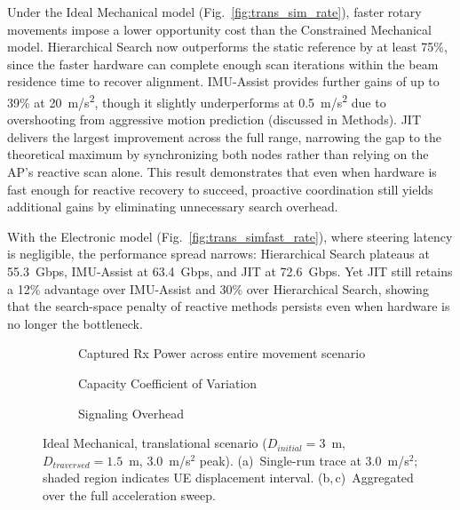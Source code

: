 \documentclass[fleqn,10pt]{wlscirep}
\begin{document}
Under the Ideal Mechanical model (Fig.~\ref{fig:trans_sim_rate}), faster rotary movements impose a lower opportunity cost than the Constrained Mechanical model. Hierarchical Search now outperforms the static reference by at least 75\%, since the faster hardware can complete enough scan iterations within the beam residence time to recover alignment. IMU-Assist provides further gains of up to 39\% at \SI{20}{m/s^2}, though it slightly underperforms at \SI{0.5}{m/s^2} due to overshooting from aggressive motion prediction (discussed in Methods). JIT delivers the largest improvement across the full range, narrowing the gap to the theoretical maximum by synchronizing both nodes rather than relying on the AP's reactive scan alone. This result demonstrates that even when hardware is fast enough for reactive recovery to succeed, proactive coordination still yields additional gains by eliminating unnecessary search overhead.

With the Electronic model (Fig.~\ref{fig:trans_simfast_rate}), where steering latency is negligible, the performance spread narrows: Hierarchical Search plateaus at \SI{55.3}{Gbps}, IMU-Assist at \SI{63.4}{Gbps}, and JIT at \SI{72.6}{Gbps}. Yet JIT still retains a 12\% advantage over IMU-Assist and 30\% over Hierarchical Search, showing that the search-space penalty of reactive methods persists even when hardware is no longer the bottleneck.

\begin{figure}[ht!]
    \centering
    \begin{subfigure}[t]{0.475\textwidth}
        \vspace{0pt}
        \centering
        
        \vspace{-20pt}
        \caption{Captured Rx Power across entire movement scenario}
        \label{fig:trans_metrics_example}
    \end{subfigure}%
    \hfill
    \begin{minipage}[t]{0.475\textwidth}
        \vspace{0pt}
        \centering
        \begin{subfigure}{\linewidth}
            
            \vspace{-15pt}
            \caption{Capacity Coefficient of Variation}
            \label{fig:trans_metrics_covariance}
        \end{subfigure}
        \vfill
            \begin{subfigure}{\linewidth}
            
            \vspace{-15pt}
            \caption{Signaling Overhead}
            \label{fig:trans_metrics_overhead}
        \end{subfigure}
    \end{minipage}
    \caption{Ideal Mechanical, translational scenario ($D_{initial} = 3$~m, $D_{traversed} = 1.5$~m, $3.0$~m/s$^2$ peak). (a)~Single-run trace at $3.0$~m/s$^2$; shaded region indicates UE displacement interval. (b,\,c)~Aggregated over the full acceleration sweep.}
    \label{fig:translational_metrics}
    \vspace{-5pt}
\end{figure}
\end{document}
